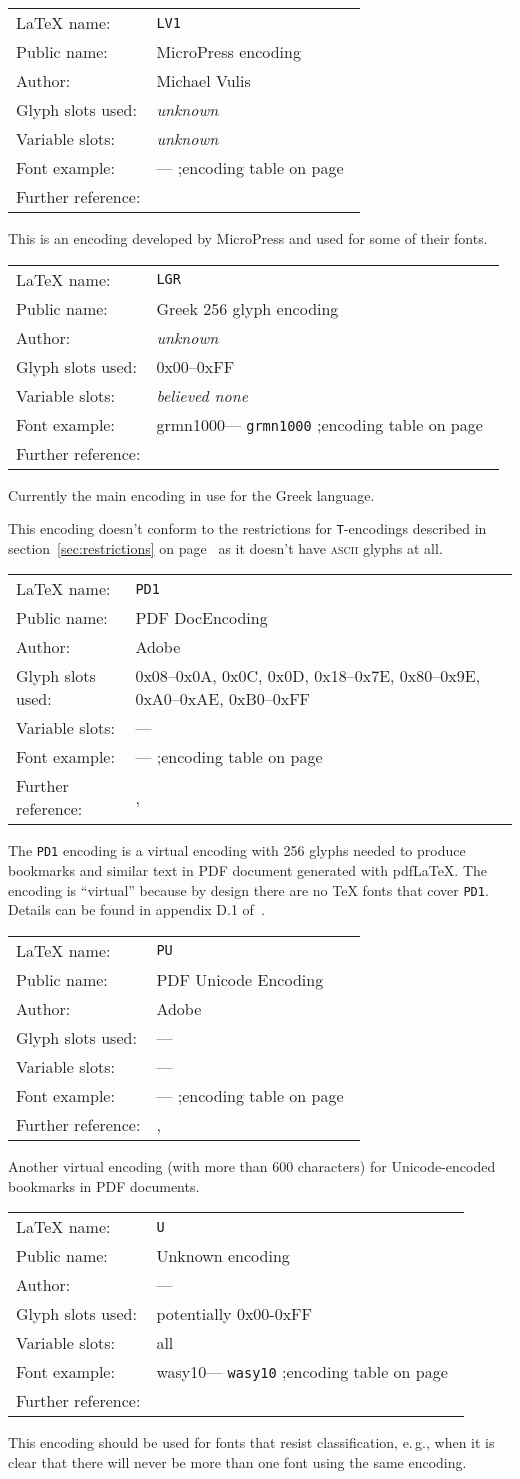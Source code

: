 \documentclass{ltxguide}[1994/11/20]
\makeatletter
\providecommand{\Enc}[1]{\texttt{#1}}
\newenvironment{encodinginfo}[7]%
  {\noindent
   \begin{tabularx}{\linewidth}{@{}l>{\raggedright\let\\\tabularnewline}X}%
     \LaTeX{} name:          & \texttt{#1}\\%
     Public name:          & #2\\%
     Author:                   & #3\\%
     Glyph slots used: & #4\\%
     Variable slots:     & #5\\%
     Font example:     & \def\@tempa{#6}\ifx\@tempa\@empty---%
                            \else\texttt{#6}\referenceftable{#6}\fi\\%
     Further reference:                & #7%
   \end{tabularx}%
   \par\nobreak
   \vspace*{3pt}%
   \quote
  }%
  {\endquote
   \vspace{6pt}}
\def\referenceftable#1{
  \@ifundefined{r@fonttable:#1}%
  \relax
  {;\space encoding table on page~\pageref{fonttable:#1}}%
}
\makeatother
\begin{document}
\begin{encodinginfo}{LV1}
        {MicroPress encoding}
        {Michael Vulis}
        {\emph{unknown}}
        {\emph{unknown}}
        {}
        {\cite[p.416]{A-W:MG2004}}

        This is an encoding developed by MicroPress and used for some of their
        fonts.

\end{encodinginfo}


\begin{encodinginfo}{LGR}
        {Greek 256 glyph encoding}
        {\emph{unknown}}
        {0x00--0xFF}
        {\emph{believed none}}
        {grmn1000}
        {\cite[p.575]{A-W:MG2004}}

        Currently the main encoding in use for the Greek language.

        This encoding doesn't conform to the restrictions for
        \Enc{T}-encodings described in section~\ref{sec:restrictions} on
        page~\pageref{sec:restrictions} as it doesn't have \textsc{ascii}
        glyphs at all.

\end{encodinginfo}


\begin{encodinginfo}
  {PD1}
  {PDF DocEncoding}
  {Adobe}
  {0x08--0x0A, 0x0C, 0x0D, 0x18--0x7E, 0x80--0x9E, 0xA0--0xAE, 0xB0--0xFF}
  {---}
  {}
  {\cite{Adobe:PDF-1.6}, \cite{hyperref}}

  The \Enc{PD1} encoding is a virtual encoding with 256 glyphs needed to
  produce bookmarks and similar text in PDF document generated with pdf\LaTeX.
  The encoding is ``virtual'' because by design there are no \TeX{}
  fonts that cover \Enc{PD1}. Details can be found in appendix D.1
  of~\cite{Adobe:PDF-1.6}.
\end{encodinginfo}

\begin{encodinginfo}
  {PU}
  {PDF Unicode Encoding}
  {Adobe}
  {---}
  {---}
  {}
  {\cite{Adobe:PDF-1.6}, \cite{hyperref}}

  Another virtual encoding (with more than 600 characters) for
  Unicode-encoded bookmarks in PDF documents.
\end{encodinginfo}

\begin{encodinginfo}{U}
        {Unknown encoding}
        {---}
        {potentially 0x00-0xFF}
        {all}
        {wasy10}
        {\cite[p.416]{A-W:MG2004}}

  This encoding should be used for fonts that resist classification,
  e.\,g., when it is clear that there will never be more than one font
  using the same encoding.

\end{encodinginfo}
\end{document}
